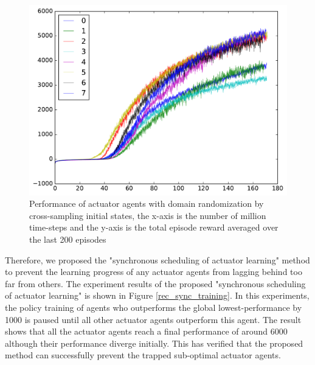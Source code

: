\begin{figure}[!htbp]
	\includegraphics[width=\textwidth]{images/rec_8task_training.pdf}
	\centering
	\caption{Performance of actuator agents with domain randomization by cross-sampling initial states, the x-axis is the number of million time-steps and the y-axis is the total episode reward averaged over the last 200 episodes}\label{rec_8task_training}
\end{figure}

Therefore, we proposed the "synchronous scheduling of actuator learning" method to prevent the learning progress of any actuator agents from lagging behind too far from others. The experiment results of the proposed "synchronous scheduling of actuator learning" is shown in Figure \ref{rec_sync_training}. In this experiments, the policy training of agents who outperforms the global lowest-performance by 1000 is paused until all other actuator agents outperform this agent. The result shows that all the actuator agents reach a final performance of around 6000 although their performance diverge initially. This has verified that the proposed method can successfully prevent the trapped sub-optimal actuator agents. 

